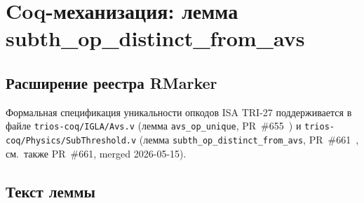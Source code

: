 \section{Coq-механизация: лемма subth\_op\_distinct\_from\_avs}
\label{sec:coq}

\subsection{Расширение реестра RMarker}

Формальная спецификация уникальности опкодов ISA TRI-27 поддерживается
в файле \texttt{trios-coq/IGLA/Avs.v} (лемма \texttt{avs\_op\_unique},
PR~\#655~\cite{pr655_t27}) и
\texttt{trios-coq/Physics/SubThreshold.v}
(лемма \texttt{subth\_op\_distinct\_from\_avs}, PR~\#661~\cite{pr661_t27},
см.\ также PR~\#661, merged 2026-05-15).

\subsection{Текст леммы}

